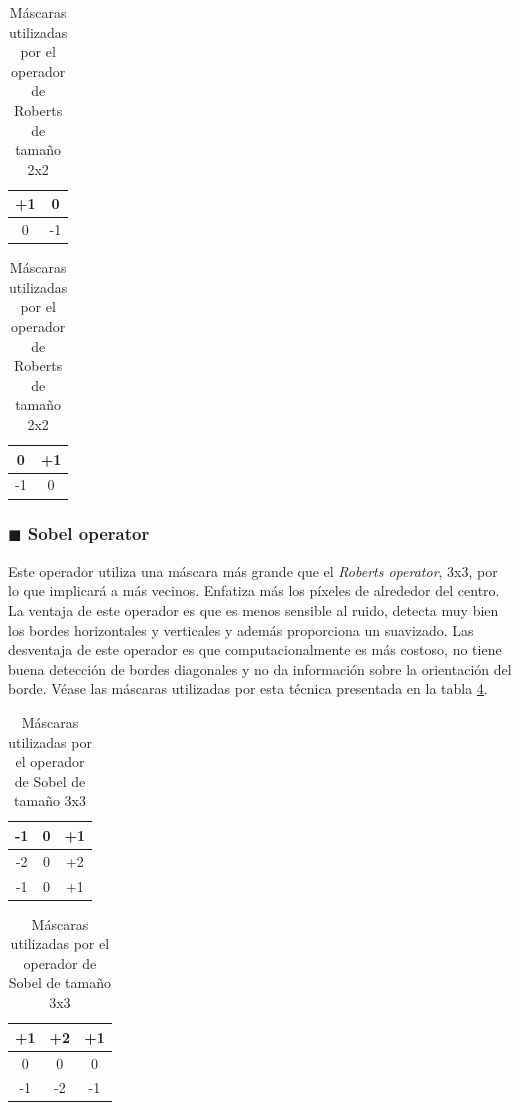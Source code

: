 \begin{table}[H]
	\parbox{.65\linewidth}{
		\centering
		\begin{tabular}{|c|c|}
			\hline
			+1 & 0 \\ \hline
			0  & -1 \\ \hline
		\end{tabular}
		\caption*{$G_x$}
	}
	\hspace*{-50mm}
	\parbox{.65\linewidth}{
		\centering
		\begin{tabular}{|c|c|}
			\hline
			0 & +1 \\ \hline
			-1  & 0 \\ \hline
		\end{tabular}
		\caption*{$G_y$}
	}
	\captionsetup{justification=centering}
	\caption{M\'{a}scaras utilizadas por el operador de Roberts de tama\~{n}o 2x2}
	\label{robetsTable}
\end{table}

\subsubsection{$\blacksquare$ \quad Sobel operator}

Este operador utiliza una m\'{a}scara m\'{a}s grande que el \textit{Roberts operator}, 3x3, por lo que implicar\'{a} a m\'{a}s vecinos. Enfatiza m\'{a}s los p\'{i}xeles de alrededor del centro. La ventaja de este operador es que es menos sensible al ruido, detecta muy bien los bordes horizontales y verticales y adem\'{a}s proporciona un suavizado. Las desventaja de este operador es que computacionalmente es m\'{a}s costoso, no tiene buena detecci\'{o}n de bordes diagonales y no da informaci\'{o}n sobre la orientaci\'{o}n del borde. V\'{e}ase las m\'{a}scaras utilizadas por esta t\'{e}cnica presentada en la tabla \ref{sobelTable}.
\begin{table}[H]
	\parbox{.45\linewidth}{
	\centering
		\begin{tabular}{|c|c|c|}
			\hline
			-1 & 0 & +1 \\ \hline
			-2 & 0 & +2 \\ \hline
			-1 & 0 & +1 \\ \hline
		\end{tabular}
	\caption*{$G_x$}
	}
	\parbox{.45\linewidth}{
	\centering
		\begin{tabular}{|c|c|c|}
			\hline
			+1 & +2 & +1 \\ \hline
			0  & 0  & 0  \\ \hline
			-1 & -2 & -1 \\ \hline
		\end{tabular}
		\caption*{$G_y$}
	}
	\captionsetup{justification=centering}
	\caption{M\'{a}scaras utilizadas por el operador de Sobel de tama\~{n}o 3x3}
	\label{sobelTable}
\end{table}

